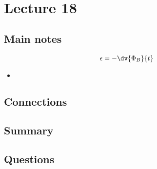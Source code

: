 \section{Lecture 18}
\subsection{Main notes}
\[
\epsilon = - \dv{\Phi_B}{t}
  \]

\begin{itemize}
	\item
\end{itemize}


\subsection{Connections}


\subsection{Summary}


\subsection{Questions}
